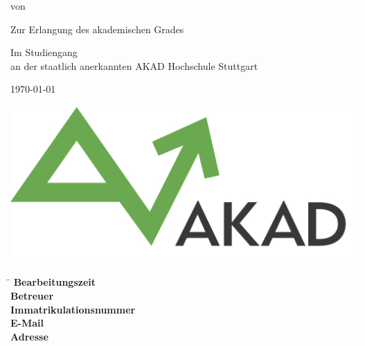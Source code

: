 \begin{titlepage}
\begin{center}
\thispagestyle{empty}

\Large{\textbf{\Titel}}
\vspace{2cm}
\onehalfspacing

\large{\Arbeitstyp}

\vspace{1cm}
\normalsize

von

\vspace{.5cm} 
\large{\Name}
\normalsize
\vspace{1cm}

\ifassignment
\else
Zur Erlangung des akademischen Grades \\
\textbf{\Grad}
\vspace{1cm}
\fi

Im Studiengang \Studiengang \\
an der staatlich anerkannten AKAD Hochschule Stuttgart
\vspace{2cm}

\today

\vspace{2cm}

\includegraphics[scale=0.35]{img/akad_logo.png}

\end{center}

\vfill
\begin{spacing}{1.2}
    \begin{tabbing}
	    \hspace{9cm}     \= \kill
	    \textbf{Bearbeitungszeit}  \>  \Bearbeitungszeit \\
	    \textbf{Betreuer}              \>  \Betreuer \\
	    \textbf{Immatrikulationsnummer}  \>  \Immatrikulationsnummer \\
	    \textbf{E-Mail}		\> \href{mailto:\Email}{\Email} \\
	    \textbf{Adresse}		\> \Strasse \\
	    		\> \PlzOrt
	\end{tabbing}
\end{spacing}
\restoregeometry
\end{titlepage}